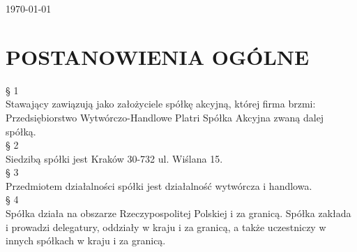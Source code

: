 \documentclass[a4paper, 11pt]{article}
\begin{document}
\begin{titlepage}
		
		
		{\large \today}\\[3cm] %
		
		
		
		
		\vfill %
		
	\end{titlepage}
	
	
	\tableofcontents
	\vfill


\section{POSTANOWIENIA OGÓLNE} 

§ 1\\

Stawający zawiązują jako założyciele spółkę akcyjną, której firma brzmi: Przedsiębiorstwo Wytwórczo-Handlowe Platri Spółka Akcyjna zwaną dalej spółką.\\ 

§ 2\\

Siedzibą spółki jest  Kraków 30-732 ul. Wiślana 15.\\ 

§ 3\\

Przedmiotem działalności spółki jest działalność wytwórcza i handlowa.\\ 

§ 4\\

Spółka działa na obszarze Rzeczypospolitej Polskiej i za granicą. Spółka zakłada i prowadzi delegatury, oddziały w kraju i za granicą, a także uczestniczy w innych spółkach w kraju i za granicą.\\ 
\end{document}
